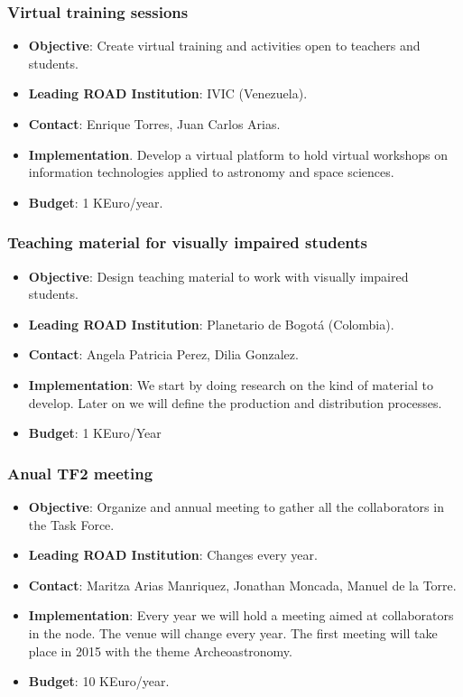 \documentclass[12pt]{article}
\begin{document}
\subsubsection{Virtual training sessions}
\begin{itemize}
\item {\bf Objective}: Create virtual training and activities open to
  teachers and students. 
\item {\bf Leading ROAD Institution}: IVIC (Venezuela).
\item {\bf Contact}: Enrique Torres, Juan Carlos Arias.
\item {\bf Implementation}. Develop a virtual platform to hold virtual
  workshops on information technologies applied to astronomy and space
  sciences.
\item {\bf Budget}: 1 KEuro/year.
\end{itemize}

\subsubsection{Teaching material for visually impaired students}
\begin{itemize}
\item {\bf Objective}: Design teaching material to work with visually
  impaired students. 
\item {\bf Leading ROAD Institution}: Planetario de Bogot\'a
  (Colombia). 
\item {\bf Contact}: Angela Patricia Perez, Dilia Gonzalez. 
\item {\bf Implementation}: We start by doing research on the kind of
  material to develop. Later on we will define the production and
  distribution processes.  
\item {\bf Budget}: 1 KEuro/Year
\end{itemize}

\subsubsection{Anual TF2 meeting}
\begin{itemize}
\item {\bf Objective}:  Organize and annual meeting to gather all the
  collaborators in the Task Force.
\item {\bf Leading ROAD Institution}: Changes every year.
\item {\bf Contact}: Maritza Arias Manriquez, Jonathan Moncada,  Manuel
  de la Torre.
\item {\bf Implementation}: 
Every year we will hold a meeting aimed at collaborators in the
node. The venue will change every year. The first meeting will take
place in 2015 with the theme Archeoastronomy.
\item {\bf Budget}: 10 KEuro/year.
\end{itemize}
\end{document}
